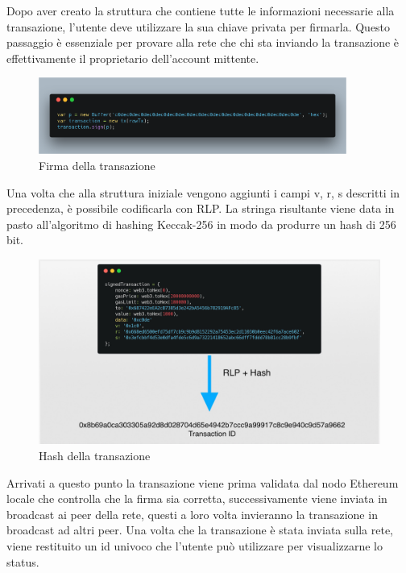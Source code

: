 \documentclass[12pt]{report}
\begin{document}
Dopo aver creato la struttura che contiene tutte le informazioni necessarie alla transazione, l'utente deve utilizzare la sua chiave privata per firmarla. Questo passaggio è essenziale per provare alla rete che chi sta inviando la transazione è effettivamente il proprietario dell'account mittente.

\begin{figure}[H]
    \centering\includegraphics[width=0.9\textwidth]{carbon-9}
    \caption{Firma della transazione}
\end{figure}

Una volta che alla struttura iniziale vengono aggiunti i campi v, r, s descritti in precedenza, è possibile codificarla con RLP. La stringa risultante viene data in pasto all'algoritmo di hashing Keccak-256 in modo da produrre un hash di 256 bit.

\begin{figure}[H]
    \centering\includegraphics[width=\textwidth]{rlpHash}
    \caption{Hash della transazione}
\end{figure}

Arrivati a questo punto la transazione viene prima validata dal nodo Ethereum locale che controlla che la firma sia corretta, successivamente viene inviata in broadcast ai peer della rete, questi a loro volta invieranno la transazione in broadcast ad altri peer.
Una volta che la transazione è stata inviata sulla rete, viene restituito un id univoco che l'utente può utilizzare per visualizzarne lo status.
\end{document}
